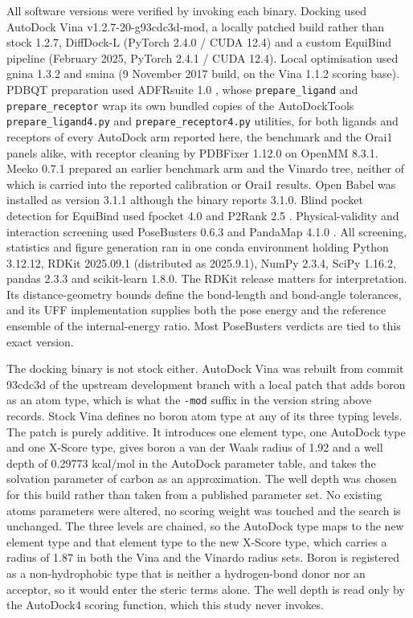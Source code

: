 All software versions were verified by invoking each binary. Docking used AutoDock Vina v1.2.7-20-g93cdc3d-mod, a locally patched build rather than stock 1.2.7, DiffDock-L (PyTorch 2.4.0 / CUDA 12.4) and a custom EquiBind pipeline (February 2025, PyTorch 2.4.1 / CUDA 12.4). Local optimisation used gnina 1.3.2 and smina (9 November 2017 build, on the Vina 1.1.2 scoring base). PDBQT preparation used ADFRsuite 1.0 \cite{ref089}, whose \texttt{prepare\_ligand} and \texttt{prepare\_receptor} wrap its own bundled copies of the AutoDockTools \cite{ref049} \texttt{prepare\_ligand4.py} and \texttt{prepare\_receptor4.py} utilities, for both ligands and receptors of every AutoDock arm reported here, the benchmark and the Orai1 panels alike, with receptor cleaning by PDBFixer 1.12.0 on OpenMM 8.3.1. Meeko 0.7.1 \cite{ref087} prepared an earlier benchmark arm and the Vinardo tree, neither of which is carried into the reported calibration or Orai1 results. Open Babel \cite{ref088} was installed as version 3.1.1 although the binary reports 3.1.0. Blind pocket detection for EquiBind used fpocket 4.0 \cite{ref060} and P2Rank 2.5 \cite{ref061}. Physical-validity and interaction screening used PoseBusters 0.6.3 \cite{ref035} and PandaMap 4.1.0 \cite{ref090}. All screening, statistics and figure generation ran in one conda environment holding Python 3.12.12, RDKit 2025.09.1 (distributed as 2025.9.1), NumPy 2.3.4, SciPy 1.16.2, pandas 2.3.3 and scikit-learn 1.8.0. The RDKit release matters for interpretation. Its distance-geometry bounds define the bond-length and bond-angle tolerances, and its UFF implementation supplies both the pose energy and the reference ensemble of the internal-energy ratio. Most PoseBusters verdicts are tied to this exact version.

The docking binary is not stock either. AutoDock Vina was rebuilt from commit 93cdc3d of the upstream development branch with a local patch that adds boron as an atom type, which is what the \texttt{-mod} suffix in the version string above records. Stock Vina defines no boron atom type at any of its three typing levels. The patch is purely additive. It introduces one element type, one AutoDock type and one X-Score type, gives boron a van der Waals radius of 1.92\angstrom{} and a well depth of 0.29773 kcal/mol in the AutoDock parameter table, and takes the solvation parameter of carbon as an approximation. The well depth was chosen for this build rather than taken from a published parameter set. No existing atom\textquotesingle s parameters were altered, no scoring weight was touched and the search is unchanged. The three levels are chained, so the AutoDock type maps to the new element type and that element type to the new X-Score type, which carries a radius of 1.87\angstrom{} in both the Vina and the Vinardo radius sets. Boron is registered as a non-hydrophobic type that is neither a hydrogen-bond donor nor an acceptor, so it would enter the steric terms alone. The well depth is read only by the AutoDock4 scoring function, which this study never invokes.

